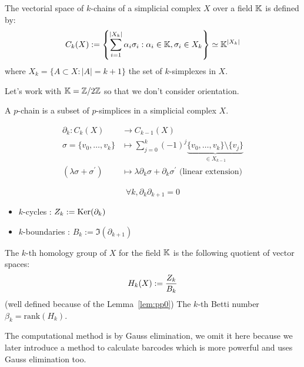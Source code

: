\begin{definition}
  The vectorial space of $k$-chains of a simplicial complex $X$ over a field $\mathbb{K}$ is defined by:
  $$
  C_k(X) := \left\{\sum_{i=1}^{\left|X_k\right|} \alpha_i \sigma_i: \alpha_i \in \mathbb{K}, \sigma_i \in X_k\right\}
  \simeq \mathbb{K}^{|X_k|}
  $$
  where $X_k = \{A\subset X : |A|=k+1\}$ the set of $k$-simplexes in $X$.
\end{definition}
\RM Let's work with $\mathbb{K} = \mathbb{Z}/2\mathbb{Z}$ so that we don't consider orientation.

\begin{definition}[$p$-chain]
  A $p$-chain is a subset of $p$-simplices in a simplicial complex $X$.
\end{definition}

\begin{definition}
  $$
  \begin{aligned}
  \partial_k: C_k(X) & \to C_{k-1}(X) \\
  \sigma=\{ v_0, \ldots, v_k \} & \mapsto \sum_{j=0}^k(-1)^j \underbrace{ \{v_0,\ldots,v_k \} \setminus \{v_j\}}_{\in X_{k-1}} \\
  \left(\lambda \sigma+\sigma^{\prime}\right) & \mapsto \lambda \partial_k \sigma+\partial_k \sigma^{\prime} \text{ (linear extension)}
  \end{aligned}
  $$
\end{definition}

\begin{lemma}
  $$
  \forall k, \partial_k \partial_{k+1} = 0
  $$
  \label{lem:pp0}
\end{lemma}

\begin{definition}
  \begin{itemize}
    \item $k$-cycles : $Z_k:=\operatorname{Ker}(\partial_k)$
    \item $k$-boundaries : $B_k:=\Im(\partial_{k+1})$
  \end{itemize}
  The $k$-th homology group of $X$ for the field $\mathbb{K}$ is the following quotient
  of vector spaces:
  $$
  H_k(X):={Z_k\over B_k}
  $$
  (well defined because of the Lemma~\ref{lem:pp0})
  The $k$-th Betti number $\beta_k = \mathrm{rank}(H_k)$.
\end{definition}
\RM The computational method is by Gauss elimination, we omit it here
because we later introduce a method to calculate barcodes which is more
powerful and uses Gauss elimination too.

